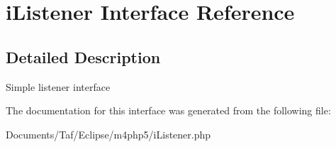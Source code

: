 \hypertarget{interfaceiListener}{
\section{iListener Interface Reference}
\label{interfaceiListener}
}


\subsection{Detailed Description}
Simple listener interface 

The documentation for this interface was generated from the following file:\begin{CompactItemize}
\item 
Documents/Taf/Eclipse/m4php5/iListener.php\end{CompactItemize}
